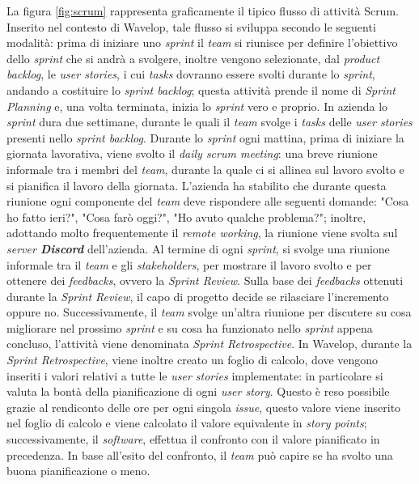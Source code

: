La figura \ref{fig:scrum} rappresenta graficamente il tipico flusso di attività Scrum. 
Inserito nel contesto di Wavelop, tale flusso si sviluppa secondo le seguenti modalità: prima di iniziare uno \emph{sprint} il \emph{team} si riunisce per definire l'obiettivo dello \emph{sprint} che si andrà a svolgere, inoltre vengono selezionate, dal \emph{product backlog}, le \emph{user stories}, i cui \emph{tasks} dovranno essere svolti durante lo \emph{sprint}, andando a costituire lo \emph{sprint backlog}; 
questa attività prende il nome di \emph{Sprint Planning} e, una volta terminata, inizia lo \emph{sprint} vero e proprio. 
In azienda lo \emph{sprint} dura due settimane, durante le quali il \emph{team} svolge i \emph{tasks} delle \emph{user stories} presenti nello \emph{sprint backlog}. 
Durante lo \emph{sprint} ogni mattina, prima di iniziare la giornata lavorativa, viene svolto il \emph{daily scrum meeting}: una breve riunione informale tra i membri del \emph{team}, durante la quale ci si allinea sul lavoro svolto e si pianifica il lavoro della giornata.
L'azienda ha stabilito che durante questa riunione ogni componente del \emph{team} deve rispondere alle seguenti domande: "Cosa ho fatto ieri?", "Cosa farò oggi?", "Ho avuto qualche problema?"; 
inoltre, adottando molto frequentemente il \emph{remote working}, la riunione viene svolta sul \emph{server \textbf{Discord}} dell'azienda. 
Al termine di ogni \emph{sprint}, si svolge una riunione informale tra il \emph{team} e gli \emph{\glspl{stakeholder}}, per mostrare il lavoro svolto e per ottenere dei \emph{feedbacks}, ovvero la \emph{Sprint Review}. Sulla base dei \emph{feedbacks} ottenuti durante la \emph{Sprint Review}, il capo di progetto decide se rilasciare l'incremento oppure no. Successivamente, il \emph{team} svolge un'altra riunione per discutere su cosa migliorare nel prossimo \emph{sprint} e su cosa ha funzionato nello \emph{sprint} appena concluso, l'attività viene denominata \emph{Sprint Retrospective}.
In Wavelop, durante la \emph{Sprint Retrospective}, viene inoltre creato un foglio di calcolo, dove vengono inseriti i valori relativi a tutte le \emph{user stories} implementate: in particolare si valuta la bontà della pianificazione di ogni \emph{user story}. 
Questo è reso possibile grazie al rendiconto delle ore per ogni singola \emph{issue}, questo valore viene inserito nel foglio di calcolo e viene calcolato il valore equivalente in \emph{story points}; successivamente, il \emph{software}, effettua il confronto con il valore pianificato in precedenza. In base all'esito del confronto, il \emph{team} può capire se ha svolto una buona pianificazione o meno.

